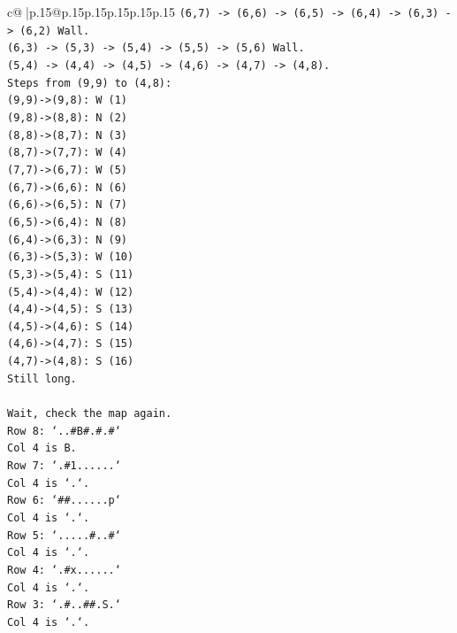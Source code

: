 \documentclass{article}
\begin{document}
{\begin{supertabular}{c@{$\;$}|p{.15\linewidth}@{}p{.15\linewidth}p{.15\linewidth}p{.15\linewidth}p{.15\linewidth}p{.15\linewidth}}
{{{\texttt{(6,7) {-}> (6,6) {-}> (6,5) {-}> (6,4) {-}> (6,3) {-}> (6,2) Wall.} \\
\texttt{(6,3) {-}> (5,3) {-}> (5,4) {-}> (5,5) {-}> (5,6) Wall.} \\
\texttt{(5,4) {-}> (4,4) {-}> (4,5) {-}> (4,6) {-}> (4,7) {-}> (4,8).} \\
\texttt{Steps from (9,9) to (4,8):} \\
\texttt{(9,9){-}>(9,8): W (1)} \\
\texttt{(9,8){-}>(8,8): N (2)} \\
\texttt{(8,8){-}>(8,7): N (3)} \\
\texttt{(8,7){-}>(7,7): W (4)} \\
\texttt{(7,7){-}>(6,7): W (5)} \\
\texttt{(6,7){-}>(6,6): N (6)} \\
\texttt{(6,6){-}>(6,5): N (7)} \\
\texttt{(6,5){-}>(6,4): N (8)} \\
\texttt{(6,4){-}>(6,3): N (9)} \\
\texttt{(6,3){-}>(5,3): W (10)} \\
\texttt{(5,3){-}>(5,4): S (11)} \\
\texttt{(5,4){-}>(4,4): W (12)} \\
\texttt{(4,4){-}>(4,5): S (13)} \\
\texttt{(4,5){-}>(4,6): S (14)} \\
\texttt{(4,6){-}>(4,7): S (15)} \\
\texttt{(4,7){-}>(4,8): S (16)} \\
\texttt{Still long.} \\
\\ 
\texttt{Wait, check the map again.} \\
\texttt{Row 8: `..\#B\#.\#.\#`} \\
\texttt{Col 4 is B.} \\
\texttt{Row 7: `.\#1......`} \\
\texttt{Col 4 is `.`.} \\
\texttt{Row 6: `\#\#......p`} \\
\texttt{Col 4 is `.`.} \\
\texttt{Row 5: `.....\#..\#`} \\
\texttt{Col 4 is `.`.} \\
\texttt{Row 4: `.\#x......`} \\
\texttt{Col 4 is `.`.} \\
\texttt{Row 3: `.\#..\#\#.S.`} \\
\texttt{Col 4 is `.`.} \\
}}}
\end{supertabular}}
\end{document}
